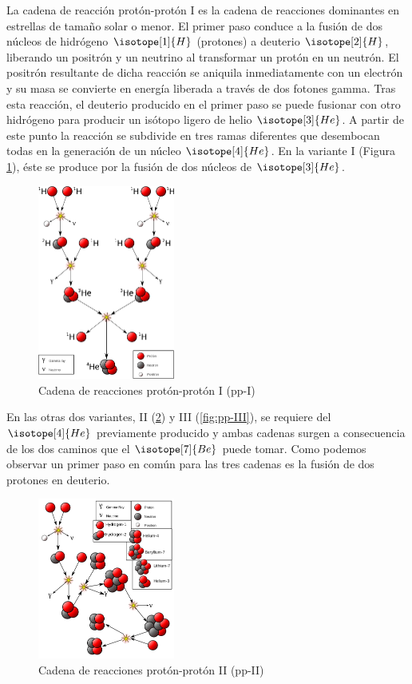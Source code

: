 La cadena de reacción protón-protón I es la cadena de reacciones dominantes en estrellas de tamaño solar o menor. El primer paso conduce a la fusión de dos núcleos de hidrógeno $\isotope[1]{H}$ (protones) a deuterio $\isotope[2]{H}$, liberando un positrón y un neutrino al transformar un protón en un neutrón. El positrón resultante de dicha reacción se aniquila inmediatamente con un electrón y su masa se convierte en energía liberada a través de dos fotones gamma. Tras esta reacción, el deuterio producido en el primer paso se puede fusionar con otro hidrógeno para producir un isótopo ligero de helio $\isotope[3]{He}$. A partir de este punto la reacción se subdivide en tres ramas diferentes que desembocan todas en la generación de un núcleo $\isotope[4]{He}$. En la variante I (Figura \ref{fig:pp-I}), éste se produce por la fusión de dos núcleos de $\isotope[3]{He}$.\par


\begin{figure}
	\centering
	\includegraphics[width=0.4\textwidth]{img/tesis/pp-I.png}
	\caption {Cadena de reacciones protón-protón I (pp-I)}
	\label{fig:pp-I}
\end{figure}

En las otras dos variantes, II (\ref{fig:pp-II}) y III (\ref{fig:pp-III}), se requiere del $\isotope[4]{He}$ previamente producido y ambas cadenas surgen a consecuencia de los dos caminos que el $\isotope[7]{Be}$ puede tomar. Como podemos observar un primer paso en común para las tres cadenas es la fusión de dos protones en deuterio.

\begin{figure}
	\centering
	\includegraphics[width=0.4\textwidth]{img/tesis/pp-II.png}
	\caption {Cadena de reacciones protón-protón II (pp-II)}
	\label{fig:pp-II}
\end{figure}

